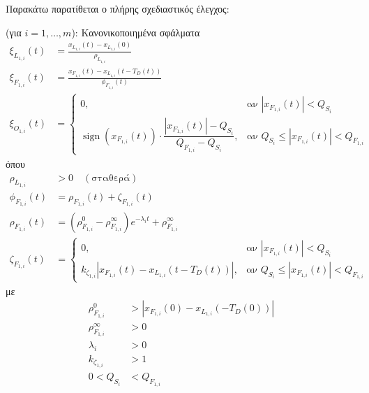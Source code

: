 \bigskip 
Παρακάτω παρατίθεται ο πλήρης σχεδιαστικός έλεγχος:

\begin{step}\label{step:1:control}
(για \( i = 1, \dots, m \)):
\bigskip
Κανονικοποιημένα σφάλματα
\begin{align}
  \xi_{L_{1,i}}(t) & = \frac{x_{L_{1,i}}(t) - x_{L_{1,i}}(0)}{\rho_{L_{1,i}}} \label{xiL1}             \\[0.3cm]
  \xi_{F_{1,i}}(t) & = \frac{x_{F_{1,i}}(t) - x_{L_{1,i}}(t - T_D(t))}{\phi_{F_{1,i}}(t)} \label{xiF1} \\[0.3cm]
  \xi_{O_{1,i}}(t) & =
  \begin{cases}
    0,                                                                                                     & \text{αν } | x_{F_{1,i}}(t) | < Q_{S_i}                  \\[0.3cm]
    \operatorname{sign}(x_{F_{1,i}}(t)) \cdot \dfrac{| x_{F_{1,i}}(t) | - Q_{S_i}}{Q_{F_{1,i}} - Q_{S_i}}, & \text{αν } Q_{S_i} \leq | x_{F_{1,i}}(t) | < Q_{F_{1,i}}
  \end{cases} \label{xiO1}
\end{align}
όπου
\begin{align}
  \rho_{L_{1,i}} &> 0 \quad (\text{σταθερά}) \label{rhoL1_define} \\[0.3cm]
  \phi_{F_{1,i}}(t) &= \rho_{F_{1,i}}(t) + \zeta_{F_{1,i}}(t) \label{phiF1_define} \\[0.3cm]
  \rho_{F_{1,i}}(t) &= \left( \rho^{0}_{F_{1,i}} - \rho^{\infty}_{F_{1,i}} \right) e^{-\lambda_i t} + \rho^{\infty}_{F_{1,i}} \label{rhoF1_define} \\[0.3cm]
  \zeta_{F_{1,i}}(t) &=
  \begin{cases}
    0,                                                                       & \text{αν } | x_{F_{1,i}}(t) | < Q_{S_i}                  \\[0.3cm]
    k_{\zeta_{1,i}} \left| x_{F_{1,i}}(t) - x_{L_{1,i}}(t - T_D(t)) \right|, & \text{αν } Q_{S_i} \leq | x_{F_{1,i}}(t) | < Q_{F_{1,i}}
  \end{cases} \label{zetaF1_define}
\end{align}
με
\begin{align}
  \rho^{0}_{F_{1,i}}      & > \left| x_{F_{1,i}}(0) - x_{L_{1,i}}(-T_D(0)) \right| \label{rhoF10>} \\[0.3cm]
  \rho^{\infty}_{F_{1,i}} & > 0   \label{rhoinfty}              \\[0.3cm]
  \lambda_{i}        & > 0    \label{lambda}              \\[0.3cm]
  k_{\zeta_{1,i}}         & > 1    \label{kzeta1}              \\[0.3cm]
  0 < Q_{S_i}             & < Q_{F_{1,i}}\ \label{QsQF1}
\end{align}


\end{step}

